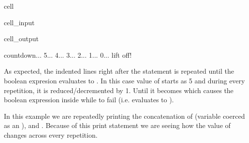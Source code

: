 \documentclass[letterpaper,10pt,english]{jupyterBook}
\begin{document}
\begin{sphinxuseclass}{cell}\begin{sphinxVerbatimInput}

\begin{sphinxuseclass}{cell_input}
\begin{sphinxVerbatim}[commandchars=\\\{\}]
  
   
      
        
\end{sphinxVerbatim}

\end{sphinxuseclass}\end{sphinxVerbatimInput}
\begin{sphinxVerbatimOutput}

\begin{sphinxuseclass}{cell_output}
\begin{sphinxVerbatim}[commandchars=\\\{\}]
countdown...
5...
4...
3...
2...
1...
0...
lift off!
\end{sphinxVerbatim}

\end{sphinxuseclass}\end{sphinxVerbatimOutput}

\end{sphinxuseclass}
\sphinxAtStartPar
As expected, the indented lines right after the  statement is repeated until the boolean expresion  evaluates to . In this case value of  starts as 5 and during every repetition, it is reduced/decremented by 1. Until it becomes  which causes the boolean expression inside while to fail (i.e. evaluates to ).

\sphinxAtStartPar
In this example we are repeatedly printing the concatenation of  (variable  coerced as an ), and . Because of this print statement we are seeing how the value of  changes across every repetition.
\end{document}
